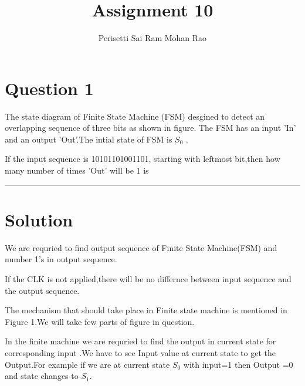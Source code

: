 \documentclass{article}
\title{Assignment 10}
\author{Perisetti Sai Ram Mohan Rao}
\begin{document}
\maketitle

\section{Question 1}
The state diagram of Finite State Machine (FSM) desgined to detect an overlapping sequence of three bits as shown in figure. The FSM has an input 'In' and an output 'Out'.The intial state of FSM is $S_0$ .

\begin{figure}[h]
\centering

\caption{}
\label{figure}
\end{figure}

If the input sequence is 10101101001101, starting with leftmost bit,then how many number of times 'Out' will be 1 is \rule{2cm}{0.10mm}

\maketitle 

\section{Solution}
We are requried to find output sequence of Finite State Machine(FSM) and number 1's in output sequence.

\begin{figure}[h]
\centering

\caption{}
\label{figure}
\end{figure}

If the CLK is not applied,there will be no differnce between input sequence and the output sequence.

The mechanism that should take place in Finite state machine is mentioned in Figure 1.We will take few parts of figure in question.

\begin{figure}[h]
\centering

\caption{}
\label{figure}
\end{figure}


\begin{figure}[h]
\centering

\caption{}
\label{figure}
\end{figure}


In the finite machine we are requried to find the output in current state for corresponding input .We have to see Input value at current state to get the Output.For example if we are at current state $S_0$ with input=1 then Output =0 and state changes to $S_1$.
\end{document}
